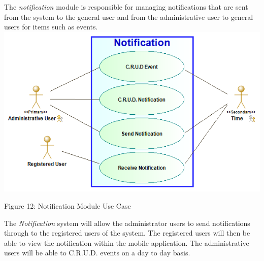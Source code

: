 The \textit{notification} module is responsible for managing notifications that are sent from the system to the general user and from the administrative user to general users for items such as events.\\

\includegraphics[width=\textwidth]{images/Notification_Use_Case_Diagram.png}

\begin{center}
	Figure 12: Notification Module Use Case
\end{center}
{
The \textit{Notification} system will allow the administrator users to send notifications through to the registered users of the system.
The registered users will then be able to view the notification within the mobile application.
The administrative users will be able to C.R.U.D. events on a day to day basis.
}
